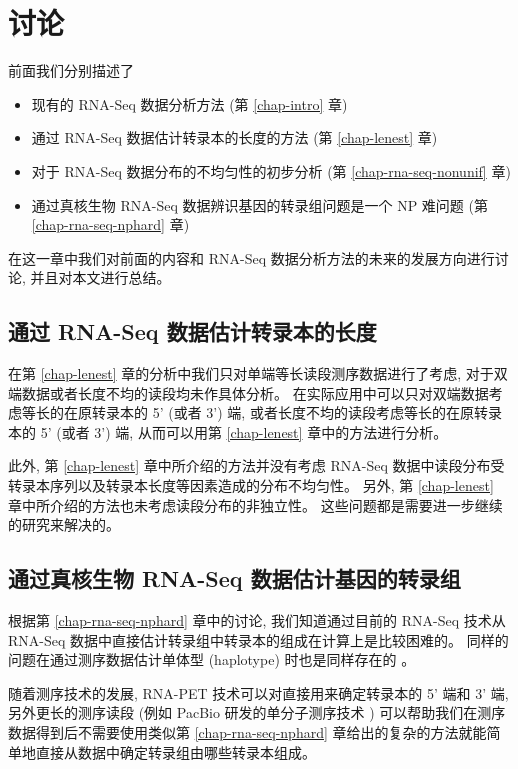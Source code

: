 \chapter{讨论}
前面我们分别描述了
\begin{itemize}
\item 现有的 RNA-Seq 数据分析方法 (第 \ref{chap-intro} 章) 
\item 通过 RNA-Seq 数据估计转录本的长度的方法 (第 \ref{chap-lenest} 章)  
\item 对于 RNA-Seq 数据分布的不均匀性的初步分析 (第 \ref{chap-rna-seq-nonunif} 章)  
\item 通过真核生物 RNA-Seq 数据辨识基因的转录组问题是一个 NP 难问题 (第 \ref{chap-rna-seq-nphard} 章)  
\end{itemize} 
在这一章中我们对前面的内容和 RNA-Seq 数据分析方法的未来的发展方向进行讨论, 
并且对本文进行总结。 

\section{通过 RNA-Seq 数据估计转录本的长度}
在第 \ref{chap-lenest} 章的分析中我们只对单端等长读段测序数据进行了考虑, 
对于双端数据或者长度不均的读段均未作具体分析。 
在实际应用中可以只对双端数据考虑等长的在原转录本的 5' (或者 3') 端, 
或者长度不均的读段考虑等长的在原转录本的 5' (或者 3') 端, 
从而可以用第 \ref{chap-lenest} 章中的方法进行分析。 

此外, 第 \ref{chap-lenest} 章中所介绍的方法并没有考虑 RNA-Seq 
数据中读段分布受转录本序列以及转录本长度等因素造成的分布不均匀性。 
另外, 第 \ref{chap-lenest} 章中所介绍的方法也未考虑读段分布的非独立性。 
这些问题都是需要进一步继续的研究来解决的。 

\section{通过真核生物 RNA-Seq 数据估计基因的转录组}
根据第 \ref{chap-rna-seq-nphard} 章中的讨论, 
我们知道通过目前的 RNA-Seq 技术从 RNA-Seq 数据中直接估计转录组中转录本的组成在计算上是比较困难的。 
同样的问题在通过测序数据估计单体型 (haplotype) 
\cite{Li_Kim_Waterman_2004, Xing_Jordan_Sharan_2007} 时也是同样存在的 \cite{1668028}。 

随着测序技术的发展, 
RNA-PET \cite{Fullwood01042009} 技术可以对直接用来确定转录本的 5' 端和 3' 端, 
另外更长的测序读段 (例如 PacBio 研发的单分子测序技术 \cite{hybrid.rna.seq.2012})
可以帮助我们在测序数据得到后不需要使用类似第 \ref{chap-rna-seq-nphard} 
章给出的复杂的方法就能简单地直接从数据中确定转录组由哪些转录本组成。 

